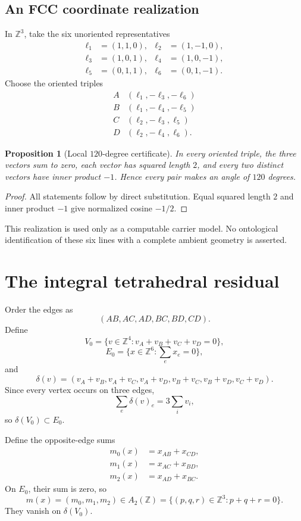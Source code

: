 \documentclass[11pt]{amsart}
\newtheorem{proposition}[theorem]{Proposition}
\theoremstyle{definition}
\theoremstyle{remark}
\newcommand{\Z}{\mathbb Z}
\begin{document}
\subsection{An FCC coordinate realization}

In $\Z^3$, take the six unoriented representatives
\begin{align*}
\ell_1&=(1,1,0), & \ell_2&=(1,-1,0),\\
\ell_3&=(1,0,1), & \ell_4&=(1,0,-1),\\
\ell_5&=(0,1,1), & \ell_6&=(0,1,-1).
\end{align*}
Choose the oriented triples
\[
\begin{array}{c|c}
A&(\ell_1,-\ell_3,-\ell_6)\\
B&(\ell_1,-\ell_4,-\ell_5)\\
C&(\ell_2,-\ell_3,\ell_5)\\
D&(\ell_2,-\ell_4,\ell_6).
\end{array}
\]

\begin{proposition}[Local $120$-degree certificate]\label{prop:120}
In every oriented triple, the three vectors sum to zero, each vector has squared length $2$, and every two distinct vectors have inner product $-1$. Hence every pair makes an angle of $120$ degrees.
\end{proposition}

\begin{proof}
All statements follow by direct substitution. Equal squared length $2$ and inner product $-1$ give normalized cosine $-1/2$.
\end{proof}

This realization is used only as a computable carrier model. No ontological identification of these six lines with a complete ambient geometry is asserted.

\section{The integral tetrahedral residual}\label{sec:integral}

Order the edges as
\[
 (AB,AC,AD,BC,BD,CD).
\]
Define
\[
 V_0=\{v\in\Z^4:v_A+v_B+v_C+v_D=0\},
\]
\[
 E_0=\{x\in\Z^6:\textstyle\sum_e x_e=0\},
\]
and
\[
\delta(v)=
(v_A+v_B,v_A+v_C,v_A+v_D,v_B+v_C,v_B+v_D,v_C+v_D).
\]
Since every vertex occurs on three edges,
\[
 \sum_e\delta(v)_e=3\sum_i v_i,
\]
so $\delta(V_0)\subset E_0$.

Define the opposite-edge sums
\begin{align*}
 m_0(x)&=x_{AB}+x_{CD},\\
 m_1(x)&=x_{AC}+x_{BD},\\
 m_2(x)&=x_{AD}+x_{BC}.
\end{align*}
On $E_0$, their sum is zero, so
\[
 m(x)=(m_0,m_1,m_2)\in A_2(\Z)
 =\{(p,q,r)\in\Z^3:p+q+r=0\}.
\]
They vanish on $\delta(V_0)$.
\end{document}
